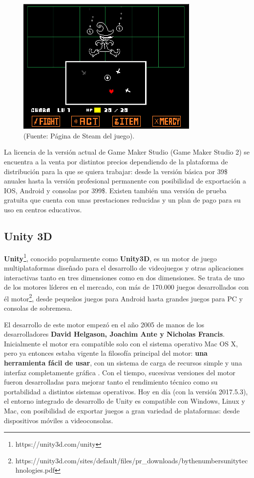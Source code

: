 \begin{figure}[h]
	\includegraphics[width=0.8\textwidth]{images/estadodelarte/motores/undertale}
	\centering
	\caption{ (Fuente: Página de Steam del juego).}
	\label{undertale}
\end{figure}

La licencia de la versión actual de Game Maker Studio (Game Maker Studio 2) se encuentra a la venta por distintos precios dependiendo de la plataforma de distribución para la que se quiera trabajar: desde la versión básica por 39\$ anuales hasta la versión profesional permanente con posibilidad de exportación a IOS, Android y consolas por 399\$. Existen también una versión de prueba gratuita que cuenta con unas prestaciones reducidas y un plan de pago para su uso en centros educativos.

\subsection{Unity 3D}
\textbf{Unity}\footnote{https://unity3d.com/unity}, conocido popularmente como \textbf{Unity3D}, es un motor de juego multiplataformas diseñado para el desarrollo de videojuegos y otras aplicaciones interactivas tanto en tres dimensiones como en dos dimensiones. Se trata de uno de los motores líderes en el mercado, con más de 170.000 juegos desarrollados con él motor\footnote{https://unity3d.com/sites/default/files/pr\_downloads/bythenumbersunitytechnologies.pdf}, desde pequeños juegos para Android hasta grandes juegos para PC y consolas de sobremesa.

El desarrollo de este motor empezó en el año 2005 de manos de los desarrolladores \textbf{David Helgason, Joachim Ante y Nicholas Francis}. Inicialmente el motor era compatible solo con el sistema operativo Mac OS X, pero ya entonces estaba vigente la filosofía principal del motor: \textbf{una herramienta fácil de usar}, con un sistema de carga de recursos simple y una interfaz completamente gráfica \cite{unity_story}. Con el tiempo, sucesivas versiones del motor fueron desarrolladas para mejorar tanto el rendimiento técnico como su portabilidad a distintos sistemas operativos. Hoy en día (con la versión 2017.5.3), el entorno integrado de desarrollo de Unity es compatible con Windows, Linux y Mac, con posibilidad de exportar juegos a gran variedad de plataformas: desde dispositivos móviles a videoconsolas.


